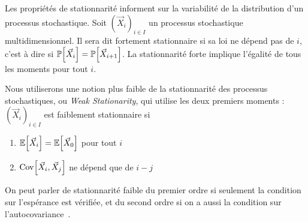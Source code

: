 Les propriétés de stationnarité informent sur la variabilité de la distribution d'un processus stochastique. Soit $(\vec{X}_i)_{i\in I}$ un processus stochastique multidimensionnel. Il sera dit fortement stationnaire si sa loi ne dépend pas de $i$, c'est à dire si $\operatorname{\mathbb{P}}\!\left[\vec{X}_i\right] = \operatorname{\mathbb{P}}\!\left[\vec{X}_{i+1}\right]$. La stationnarité forte implique l'égalité de tous les moments pour tout $i$.

Nous utiliserons une notion plus faible de la stationnarité des processus stochastiques, ou \emph{Weak Stationarity}, qui utilise les deux premiers moments : $(\vec{X}_i)_{i\in I}$ est faiblement stationnaire si
\begin{enumerate}
	\item $\operatorname{\mathbb{E}}\!\left[\vec{X}_i\right] = \operatorname{\mathbb{E}}\!\left[\vec{X}_0\right]$ pour tout $i$
	\item $\operatorname{Cov}\!\left[\vec{X}_i,\vec{X}_j\right]$ ne dépend que de $i-j$
\end{enumerate}
On peut parler de stationnarité faible du premier ordre si seulement la condition sur l'espérance est vérifiée, et du second ordre si on a aussi la condition sur l'autocovariance~\cite{zhang2014test}.










